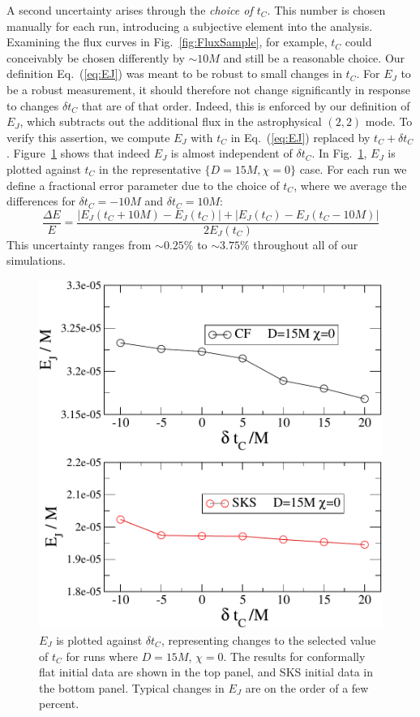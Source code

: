 A second uncertainty arises through the {\it choice of $t_C$}.
This number is chosen manually for
each run, introducing a
  subjective element into the analysis. Examining the flux curves in
Fig.~\ref{fig:FluxSample}, for example, $t_C$ could conceivably be
chosen differently by $\sim 10 M$ and still be a
reasonable choice. {Our definition Eq.~(\ref{eq:EJ}) was meant
to be robust to small changes in $t_C$.  For $E_J$ to be a robust measurement, it should
therefore not change significantly in response to changes $\delta t_C$
that are of that order. Indeed, this is enforced by our definition of
$E_J$, which subtracts out the additional flux in the astrophysical
$(2,2)$ mode.}  To verify this assertion, we compute $E_J$ with $t_C$ in Eq.~(\ref{eq:EJ}) replaced by $t_C+\delta t_C$.  Figure~\ref{fig:EvsDtC} shows that indeed $E_J$ is almost independent of $\delta t_C$.  
In Fig.~\ref{fig:EvsDtC}, $E_J$ is plotted against $t_C$
in the representative $\{D=15M, \chi=0\}$ case.
For each run we define a fractional
error parameter due to the choice of $t_C$, where we average the
differences for $\delta t_C = -10M$ and $\delta t_C = 10M$:
\begin{equation}
\frac{\Delta E}{E} = \frac{|E_J(t_C+10M) - E_J(t_C)| + |E_J(t_C) - E_J(t_C -
  10M)|}{2E_J(t_C)}
\end{equation}
This uncertainty ranges from $\sim 0.25\%$ to $\sim 3.75\%$ throughout
all of our simulations.

\begin{figure}
 \includegraphics[width=0.95\columnwidth]{chap5/EvsDtj}
  \caption[$E_J$ as a function of $\delta t_C$.]{$E_J$ is plotted against $\delta t_C$, representing changes
    to the selected value of $t_C$ for runs where $D=15M$,
    $\chi=0$. The results for conformally flat initial data are shown
    in the top panel, and SKS initial data in the bottom
    panel. Typical changes in $E_J$ are on the order of a few
    percent.}
 \label{fig:EvsDtC}
\end{figure}


